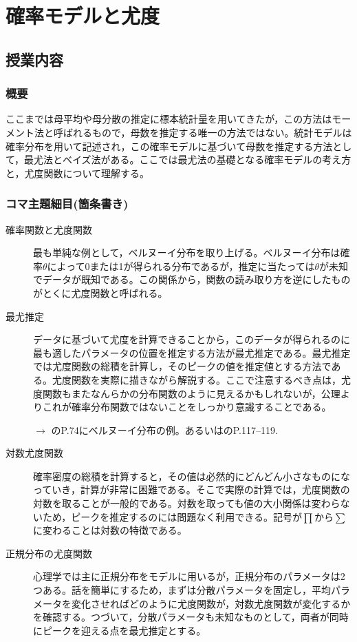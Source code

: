 \section{確率モデルと尤度}
\label{s23_Probabilitic_model}

\subsection{授業内容}
\subsubsection{概要}
ここまでは母平均や母分散の推定に標本統計量を用いてきたが，この方法はモーメント法と呼ばれるもので，母数を推定する唯一の方法ではない。統計モデルは確率分布を用いて記述され，この確率モデルに基づいて母数を推定する方法として，最尤法とベイズ法がある。ここでは最尤法の基礎となる確率モデルの考え方と，尤度関数について理解する。
\subsubsection{コマ主題細目(箇条書き)}
\begin{description}
	\item[確率関数と尤度関数]最も単純な例として，ベルヌーイ分布を取り上げる。ベルヌーイ分布は確率$\theta$によって0または1が得られる分布であるが，推定に当たっては$\theta$が未知でデータが既知である。この関係から，関数の読み取り方を逆にしたものがとくに尤度関数と呼ばれる。

	\item[最尤推定]データに基づいて尤度を計算できることから，このデータが得られるのに最も適したパラメータの位置を推定する方法が最尤推定である。最尤推定では尤度関数の総積を計算し，そのピークの値を推定値とする方法である。尤度関数を実際に描きながら解説する。ここで注意するべき点は，尤度関数もまたなんらかの分布関数のように見えるかもしれないが，公理よりこれが確率分布関数ではないことをしっかり意識することである。
	      \begin{flushright}
		      $\to$ \textcite{Nojima201903}のP.74にベルヌーイ分布の例。あるいは\textcite{kosugi2018}のP.117--119.
	      \end{flushright}


	\item[対数尤度関数]確率密度の総積を計算すると，その値は必然的にどんどん小さなものになっていき，計算が非常に困難である。そこで実際の計算では，尤度関数の対数を取ることが一般的である。対数を取っても値の大小関係は変わらないため，ピークを推定するのには問題なく利用できる。記号が$\prod$から$\sum$に変わることは対数の特徴である。

	\item[正規分布の尤度関数]心理学では主に正規分布をモデルに用いるが，正規分布のパラメータは2つある。話を簡単にするため，まずは分散パラメータを固定し，平均パラメータを変化させればどのように尤度関数が，対数尤度関数が変化するかを確認する。つづいて，分散パラメータも未知なものとして，両者が同時にピークを迎える点を最尤推定とする。

\end{description}
